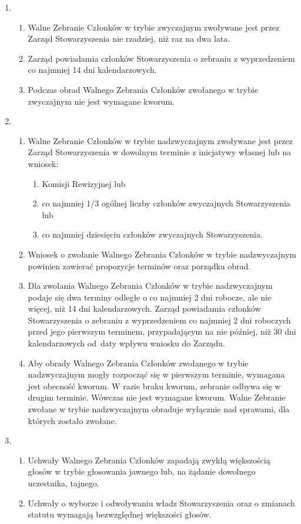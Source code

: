 \documentclass[chapterprefix,notitlepage]{article}
\begin{document}
\begin{enumerate}
	\item \begin{enumerate}
		\item Walne Zebranie Członków w trybie zwyczajnym zwoływane jest przez Zarząd Stowarzyszenia nie rzadziej, niż raz na dwa lata.
		\item Zarząd powiadamia członków Stowarzyszenia o zebraniu z wyprzedzeniem co najmniej 14 dni kalendarzowych.
		\item Podczas obrad Walnego Zebrania Członków zwołanego w trybie zwyczajnym nie jest wymagane kworum.
	\end{enumerate}
	
	\item \begin{enumerate}
		\item Walne Zebranie Członków w trybie nadzwyczajnym zwoływane jest przez Zarząd Stowarzyszenia w dowolnym terminie z inicjatywy własnej lub na wniosek:
		\begin{enumerate}
			\item Komisji Rewizyjnej lub
			\item co najmniej 1/3 ogólnej liczby członków zwyczajnych Stowarzyszenia lub
			\item co najmniej dziesięciu członków zwyczajnych Stowarzyszenia.
		\end{enumerate}
		\item Wniosek o zwołanie Walnego Zebrania Członków w trybie nadzwyczajnym powinien zawierać propozycje terminów oraz porządku obrad.
		\item Dla zwołania Walnego Zebrania Członków w trybie nadzwyczajnym podaje się dwa terminy odległe o co najmniej 2 dni robocze, ale nie więcej, niż 14 dni kalendarzowych. Zarząd powiadamia członków Stowarzyszenia o zebraniu z wyprzedzeniem co najmniej 2 dni roboczych przed jego pierwszym terminem, przypadającym na nie później, niż 30 dni kalendarzowych od~daty wpływu wniosku do Zarządu.
		\item Aby obrady Walnego Zebrania Członków zwołanego w trybie nadzwyczajnym mogły rozpocząć się w pierwszym terminie, wymagana jest obecność kworum. W razie braku kworum, zebranie odbywa się w drugim terminie. Wówczas nie jest wymagane kworum. Walne Zebranie zwołane w trybie nadzwyczajnym obraduje wyłącznie nad sprawami, dla których zostało zwołane.
	\end{enumerate}
	
	\item \begin{enumerate}
		\item Uchwały Walnego Zebrania Członków zapadają zwykłą większością głosów w trybie głosowania jawnego lub, na żądanie dowolnego uczestnika, tajnego.
		\item Uchwały o wyborze i odwoływaniu władz Stowarzyszenia oraz o zmianach statutu wymagają bezwzględnej większości głosów.
	\end{enumerate}
	

\end{enumerate}
\end{document}
